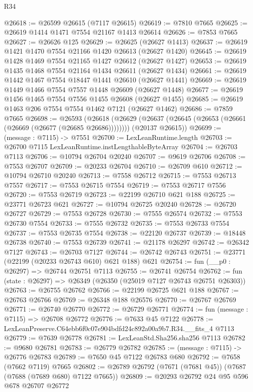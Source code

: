 \begin{lexlean}{R34}
\begin{coremodule}
@26618 := @26599 @26615 (@7117 @26615)
@26619 := @7810 @7665
@26625 := @26619 @1414 @1471 @7554 @21167 @1413 @26614
@26626 := @7853 @7665
@26627 := @26626 @125
@26629 := @26625 (@26627 @1413)
@26637 := @26619 @1421 @1470 @7554 @21166 @1420 @26613 (@26627 @1420)
@26645 := @26619 @1428 @1469 @7554 @21165 @1427 @26612 (@26627 @1427)
@26653 := @26619 @1435 @1468 @7554 @21164 @1434 @26611 (@26627 @1434)
@26661 := @26619 @1442 @1467 @7554 @18447 @1441 @26610 (@26627 @1441)
@26669 := @26619 @1449 @1466 @7554 @7557 @1448 @26609 (@26627 @1448)
@26677 := @26619 @1456 @1465 @7554 @7556 @1455 @26608 (@26627 @1455)
@26685 := @26619 @1463 @206 @7554 @7554 @1462 @7121 (@26627 @1462)
@26686 := @7859 @7665
@26698 := @26593
    (@26618
      (@26629 (@26637 (@26645 (@26653 (@26661 (@26669 (@26677 (@26685 @26686))))))))
      (@20137 @26615))
@26699 := (message : @7115) -> @7551
@26700 := LexLeanRuntime.length
@26703 := @26700 @7115 LexLeanRuntime.instLengthableByteArray
@26704 := @26703 @7113
@26706 := @10794 @26704 @20240
@26707 := @9619 @26706
@26708 := @7553 @26707
@26709 := @20233 @26704
@26710 := @26709 @610
@26712 := @10794 @26710 @20240
@26713 := @7558 @26712
@26715 := @7553 @26713 @7557
@26717 := @7553 @26715 @7554
@26719 := @7553 @26717 @7556
@26720 := @7553 @26719
@26723 := @22199 @26710 @621 @188
@26725 := @23771 @26723 @621
@26727 := @10794 @26725 @20240
@26728 := @26720 @26727
@26729 := @7553 @26728
@26730 := @7555 @26574
@26732 := @7553 @26730 @7554
@26733 := @7555 @26732
@26735 := @7553 @26733 @7554
@26737 := @7553 @26735 @7554
@26738 := @22120 @26737
@26739 := @18448 @26738
@26740 := @7553 @26739
@26741 := @21178 @26297
@26742 := @26342 @7127
@26743 := @26703 @7127
@26744 := @26742 @26743
@26751 := @23771 (@22199 (@20233 @26743 @610) @621 @188) @621
@26754 := fun (__p0 : @26297) => @26744 @26751 @7113
@26755 := @26741 @26754
@26762 := fun (state : @26297) => @26349 (@26350 (@25019 @7127 @26743 @26751 @26303))
@26763 := @26755 @26762
@26766 := @22199 @26725 @621 @188
@26767 := @26763 @26766
@26769 := @26348 @188 @26576
@26770 := @26767 @26769
@26771 := @26740 @26770
@26772 := @26729 @26771
@26774 := fun (message : @7115) => @26708 @26772
@26776 := @7633 @45 @7122
@26778 := LexLeanPreserve.C64ebb6f0c07e904bdfd24c892a00a9b7.R34.__fits_4 @7113
@26779 := @7639 @26778
@26781 := LexLeanStd.Sha256.sha256 @7113
@26782 := @9680 @26781
@26783 := @26779 @26782
@26785 := (message : @7115) -> @26776 @26783
@26789 := @7650 @45 @7122 @26783 @680
@26792 := @7658 (@7662 @7119) @7665
@26802 := @26789 @26792 (@7671 (@7681 @45)) (@7687 (@7688 (@7689 @680) @7122 @7665))
@26809 := @20293 @26792 @24 @95 @596 @678 @26707 @26772

\end{coremodule}
\end{lexlean}
